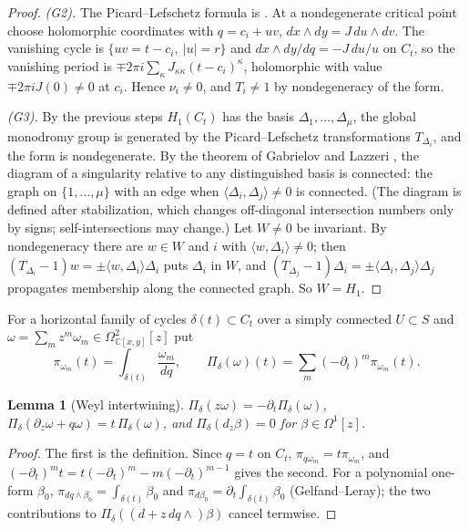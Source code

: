 \documentclass[11pt]{article}
\numberwithin{equation}{section}
\newtheorem{lemma}[lemma]{Lemma}
\theoremstyle{definition}
\theoremstyle{remark}
\newcommand{\C}{\mathbb C}
\begin{document}
\begin{proof}
\emph{(G2).} The Picard--Lefschetz formula is \cite[\S1.3, p.~26]{AGV}. At a
nondegenerate critical point choose holomorphic coordinates with
$q=c_i+uv$, $dx\wedge dy=J\,du\wedge dv$. The vanishing cycle is
$\{uv=t-c_i,\ |u|=r\}$ and $dx\wedge dy/dq=-J\,du/u$ on $C_t$, so the vanishing
period is $\mp2\pi i\sum_\kappa J_{\kappa\kappa}(t-c_i)^\kappa$, holomorphic with
value $\mp2\pi iJ(0)\ne0$ at $c_i$. Hence $\nu_i\ne0$, and $T_i\ne1$ by
nondegeneracy of the form.

\emph{(G3).} By the previous steps $H_1(C_t)$ has the basis
$\Delta_1,\dots,\Delta_\mu$, the global monodromy group is generated by the
Picard--Lefschetz transformations $T_{\Delta_i}$, and the form is nondegenerate.
By the theorem of Gabrielov and Lazzeri \cite[Theorem~3.3]{AGV}, the diagram of
a singularity relative to any distinguished basis is connected: the graph on
$\{1,\dots,\mu\}$ with an edge when $\langle\Delta_i,\Delta_j\rangle\ne0$ is
connected. (The diagram is defined after stabilization, which changes
off-diagonal intersection numbers only by signs; self-intersections may change.) Let $W\ne0$ be invariant. By
nondegeneracy there are $w\in W$ and $i$ with $\langle w,\Delta_i\rangle\ne0$;
then $(T_{\Delta_i}-1)w=\pm\langle w,\Delta_i\rangle\Delta_i$ puts $\Delta_i$ in
$W$, and $(T_{\Delta_j}-1)\Delta_i=\pm\langle\Delta_i,\Delta_j\rangle\Delta_j$
propagates membership along the connected graph. So $W=H_1$.
\end{proof}

For a horizontal family of cycles $\delta(t)\subset C_t$ over a simply connected
$U\subset S$ and $\omega=\sum_m z^m\omega_m\in\Omega^2_{\C[x,y]}[z]$ put
\[
 \pi_{\omega_m}(t)=\int_{\delta(t)}\frac{\omega_m}{dq},\qquad
 \Pi_\delta(\omega)(t)=\sum_m(-\partial_t)^m\pi_{\omega_m}(t).
\]
\begin{lemma}[Weyl intertwining]\label{lem:Pi}
$\Pi_\delta(z\omega)=-\partial_t\Pi_\delta(\omega)$,
$\Pi_\delta(\partial_z\omega+q\omega)=t\,\Pi_\delta(\omega)$, and
$\Pi_\delta(d_z\beta)=0$ for $\beta\in\Omega^1[z]$.
\end{lemma}
\begin{proof}
The first is the definition. Since $q=t$ on $C_t$, $\pi_{q\omega_m}=t\pi_{\omega_m}$,
and $(-\partial_t)^mt=t(-\partial_t)^m-m(-\partial_t)^{m-1}$ gives the second.
For a polynomial one-form $\beta_0$, $\pi_{dq\wedge\beta_0}=\int_{\delta(t)}\beta_0$
and $\pi_{d\beta_0}=\partial_t\int_{\delta(t)}\beta_0$ (Gelfand--Leray); the two
contributions to $\Pi_\delta((d+z\,dq\wedge)\beta)$ cancel termwise.
\end{proof}
\end{document}
